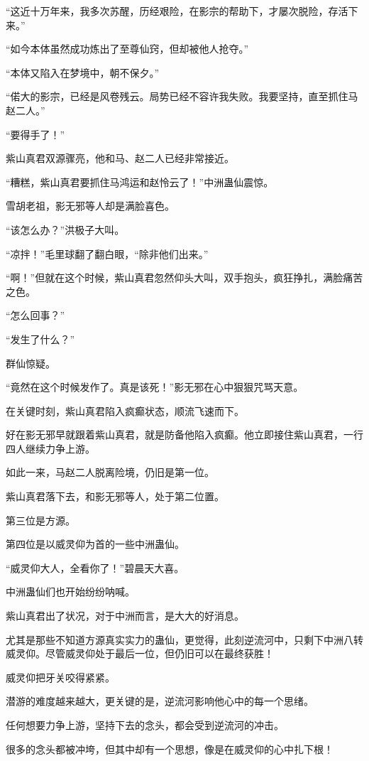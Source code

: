 \begin{this_body}
“这近十万年来，我多次苏醒，历经艰险，在影宗的帮助下，才屡次脱险，存活下来。”

“如今本体虽然成功炼出了至尊仙窍，但却被他人抢夺。”

“本体又陷入在梦境中，朝不保夕。”

“偌大的影宗，已经是风卷残云。局势已经不容许我失败。我要坚持，直至抓住马赵二人。”

“要得手了！”

紫山真君双源骤亮，他和马、赵二人已经非常接近。

“糟糕，紫山真君要抓住马鸿运和赵怜云了！”中洲蛊仙震惊。

雪胡老祖，影无邪等人却是满脸喜色。

“该怎么办？”洪极子大叫。

“凉拌！”毛里球翻了翻白眼，“除非他们出来。”

“啊！”但就在这个时候，紫山真君忽然仰头大叫，双手抱头，疯狂挣扎，满脸痛苦之色。

“怎么回事？”

“发生了什么？”

群仙惊疑。

“竟然在这个时候发作了。真是该死！”影无邪在心中狠狠咒骂天意。

在关键时刻，紫山真君陷入疯癫状态，顺流飞速而下。

好在影无邪早就跟着紫山真君，就是防备他陷入疯癫。他立即接住紫山真君，一行四人继续力争上游。

如此一来，马赵二人脱离险境，仍旧是第一位。

紫山真君落下去，和影无邪等人，处于第二位置。

第三位是方源。

第四位是以威灵仰为首的一些中洲蛊仙。

“威灵仰大人，全看你了！”碧晨天大喜。

中洲蛊仙们也开始纷纷呐喊。

紫山真君出了状况，对于中洲而言，是大大的好消息。

尤其是那些不知道方源真实实力的蛊仙，更觉得，此刻逆流河中，只剩下中洲八转威灵仰。尽管威灵仰处于最后一位，但仍旧可以在最终获胜！

威灵仰把牙关咬得紧紧。

潜游的难度越来越大，更关键的是，逆流河影响他心中的每一个思绪。

任何想要力争上游，坚持下去的念头，都会受到逆流河的冲击。

很多的念头都被冲垮，但其中却有一个思想，像是在威灵仰的心中扎下根！


\end{this_body}
